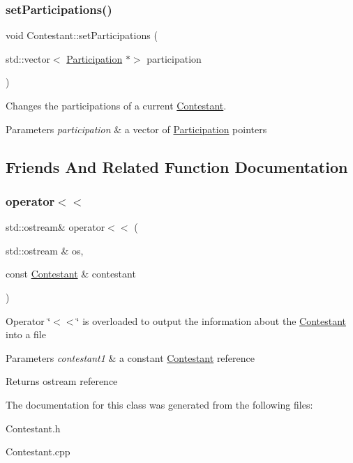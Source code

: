 \subsubsection{\texorpdfstring{set\+Participations()}{setParticipations()}}
{\footnotesize\ttfamily void Contestant\+::set\+Participations (\begin{DoxyParamCaption}\item[{std\+::vector$<$ \hyperlink{struct_participation}{Participation} $\ast$$>$}]{participation }\end{DoxyParamCaption})}



Changes the participations of a current \hyperlink{class_contestant}{Contestant}. 


\begin{DoxyParams}{Parameters}
{\em participation} & a vector of \hyperlink{struct_participation}{Participation} pointers \\
\hline
\end{DoxyParams}


\subsection{Friends And Related Function Documentation}
\mbox{\label{class_contestant_af6619c3c4998b08f93ea4a4568201ebe}} 
\subsubsection{\texorpdfstring{operator$<$$<$}{operator<<}}
{\footnotesize\ttfamily std\+::ostream\& operator$<$$<$ (\begin{DoxyParamCaption}\item[{std\+::ostream \&}]{os,  }\item[{const \hyperlink{class_contestant}{Contestant} \&}]{contestant }\end{DoxyParamCaption})\hspace{0.3cm}{\ttfamily [friend]}}

Operator \char`\"{}$<$$<$\char`\"{} is overloaded to output the information about the \hyperlink{class_contestant}{Contestant} into a file 
\begin{DoxyParams}{Parameters}
{\em contestant1} & a constant \hyperlink{class_contestant}{Contestant} reference \\
\hline
\end{DoxyParams}
\begin{DoxyReturn}{Returns}
ostream reference 
\end{DoxyReturn}


The documentation for this class was generated from the following files\+:\begin{DoxyCompactItemize}
\item 
Contestant.\+h\item 
Contestant.\+cpp\end{DoxyCompactItemize}
